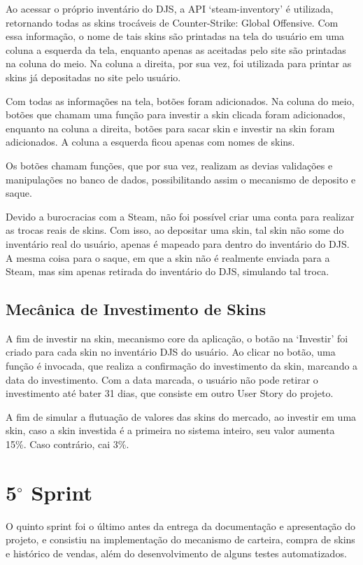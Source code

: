 Ao acessar o próprio inventário do DJS, a API ‘steam-inventory’ é utilizada, retornando todas as 
skins trocáveis de Counter-Strike: Global Offensive. Com essa informação, o nome de tais skins são 
printadas na tela do usuário em uma coluna a esquerda da tela, enquanto apenas as aceitadas pelo site 
são printadas na coluna do meio. Na coluna a direita, por sua vez, foi utilizada para printar as 
skins já depositadas no site pelo usuário. 

Com todas as informações na tela, botões foram adicionados. Na coluna do meio, botões que chamam 
uma função para investir a skin clicada foram adicionados, enquanto na coluna a direita, botões 
para sacar skin e investir na skin foram adicionados. A coluna a esquerda ficou apenas com nomes 
de skins.

Os botões chamam funções, que por sua vez, realizam as devias validações e manipulações no banco 
de dados, possibilitando assim o mecanismo de deposito e saque.

Devido a burocracias com a Steam, não foi possível criar uma conta para realizar as trocas reais 
de skins. Com isso, ao depositar uma skin, tal skin não some do inventário real do usuário, 
apenas é mapeado para dentro do inventário do DJS. A mesma coisa para o saque, em que a 
skin não é realmente enviada para a Steam, mas sim apenas retirada do inventário do DJS, 
simulando tal troca.

\subsection{Mecânica de Investimento de Skins}
A fim de investir na skin, mecanismo core da aplicação, o botão na ‘Investir’ foi criado 
para cada skin no inventário DJS do usuário. Ao clicar no botão, uma função é invocada, 
que realiza a confirmação do investimento da skin, marcando a data do investimento.
Com a data marcada, o usuário não pode retirar o investimento até bater 31 dias, que 
consiste em outro User Story do projeto.

A fim de simular a flutuação de valores das skins do mercado, ao investir em uma skin, 
caso a skin investida é a primeira no sistema inteiro, seu valor aumenta 
15\%. Caso contrário, cai 3\%.

\section{5$^{\circ}$ Sprint}
O quinto sprint foi o último antes da entrega da documentação e apresentação do projeto, e consistiu na implementação do mecanismo de carteira, compra de skins e histórico de vendas, além do desenvolvimento de alguns testes automatizados.

